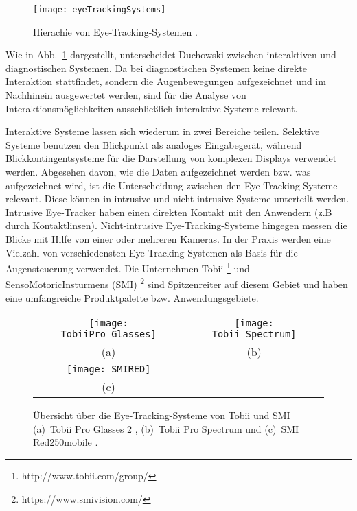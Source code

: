 \begin{figure}
\centering
\texttt{[image: eyeTrackingSystems]}
\caption{Hierachie von Eye-Tracking-Systemen \cite{Duchowski}.}
\label{fig:eyeTrackingSystems}
\end{figure}
\newline \newline
Wie in Abb.~\ref{fig:eyeTrackingSystems} dargestellt, unterscheidet Duchowski \cite{Duchowski} zwischen interaktiven und diagnostischen Systemen. Da bei diagnostischen Systemen keine direkte Interaktion stattfindet, sondern die Augenbewegungen aufgezeichnet und im Nachhinein ausgewertet werden, sind für die Analyse von Interaktionsmöglichkeiten ausschließlich interaktive Systeme relevant. 

Interaktive Systeme lassen sich wiederum in zwei Bereiche teilen. Selektive Systeme benutzen den Blickpunkt als analoges Eingabegerät, während Blickkontingentsysteme für die Darstellung von komplexen Displays verwendet werden. 
\newline \newline
Abgesehen davon, wie die Daten aufgezeichnet werden bzw. was aufgezeichnet wird, ist die Unterscheidung zwischen den Eye-Tracking-Systeme relevant. Diese können in intrusive und nicht-intrusive Systeme unterteilt werden. Intrusive Eye-Tracker haben einen direkten Kontakt mit den Anwendern (z.B durch Kontaktlinsen). Nicht-intrusive Eye-Tracking-Systeme hingegen messen die Blicke mit Hilfe von einer oder mehreren Kameras. 
\newline \newline
In der Praxis werden eine Vielzahl von verschiedensten Eye-Tracking-Systemen als Basis für die Augensteuerung verwendet. Die Unternehmen Tobii %
\footnote{http://www.tobii.com/group/}
%
und SensoMotoricInsturmens (SMI) %
\footnote{https://www.smivision.com/}
%
sind Spitzenreiter auf diesem Gebiet und haben eine umfangreiche Produktpalette bzw. Anwendungsgebiete. 
\begin{figure}
\centering\small
\setlength{\tabcolsep}{0mm}	%
\begin{tabular}{c@{\hspace{-15mm}}c} %
  \texttt{[image: TobiiPro\_Glasses]} &
  \texttt{[image: Tobii\_Spectrum]}
\\
  (a) & (b)
\\[4pt]	%
  \texttt{[image: SMIRED]}
\\
  (c)
\end{tabular}
%
\caption{Übersicht über die Eye-Tracking-Systeme von Tobii und SMI \newline
(a)~Tobii Pro Glasses 2 \cite{TobiiGlasses}, (b)~Tobii Pro Spectrum \cite{TobiiSpectrum} und (c)~SMI Red250mobile \cite{SMIRED}.}
\label{fig:Tobii}
\end{figure}


